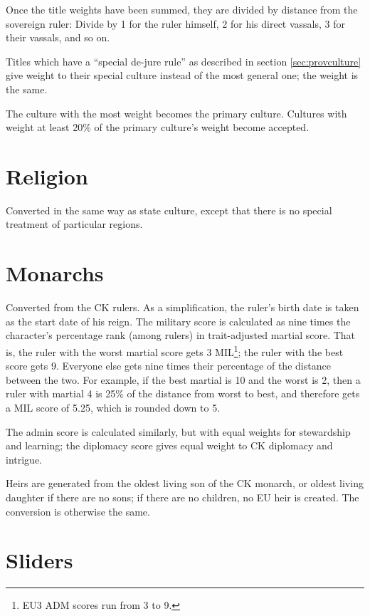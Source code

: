 \documentclass[12pt,ebook,oneside]{book}
\begin{document}
Once the title weights have been summed, they are divided by distance
from the sovereign ruler: Divide by 1 for the ruler himself, 2 for his
direct vassals, 3 for their vassals, and so on. 

Titles which have a ``special de-jure rule'' as described in section
\ref{sec:provculture} give weight to their special culture instead of
the most general one; the weight is the same. 

The culture with the most weight becomes the primary culture. 
Cultures with weight at least 20\% of the primary culture's weight
become accepted. 

\section{Religion}

Converted in the same way as state culture, except that there is no
special treatment of particular regions. 

\section{Monarchs}

Converted from the CK rulers. As a simplification, the ruler's birth
date is taken as the start date of his reign. The military score is
calculated as nine times the character's percentage rank (among
rulers) in trait-adjusted martial score. That is, the ruler with the
worst martial score gets 3 MIL\footnote{EU3 ADM scores run from 3 to 9.}; the ruler with the best score gets
9. Everyone else gets nine times their percentage of the distance
between the two. For example, if the best martial is 10 and the worst is
2, then a ruler with martial 4 is 25\% of the distance from worst to
best, and therefore gets a MIL score of 5.25, which is rounded down to
5. 

The admin score is calculated similarly, but with equal weights for
stewardship and learning; the diplomacy score gives equal weight to CK
diplomacy and intrigue. 

Heirs are generated from the oldest living son of the CK monarch, or
oldest living daughter if there are no sons; if there are no children,
no EU heir is created. The conversion is otherwise the same. 

\section{Sliders}
\end{document}
